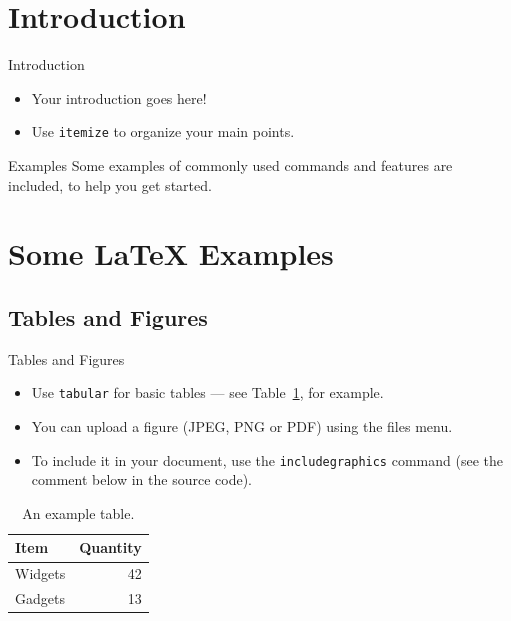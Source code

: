 \documentclass{beamer}
\begin{document}

\section{Introduction}

\begin{frame}{Introduction}

\begin{itemize}
  \item Your introduction goes here!
  \item Use \texttt{itemize} to organize your main points.
\end{itemize}

\begin{block}{Examples}
Some examples of commonly used commands and features are included, to help you get started.
\end{block}

\end{frame}

\section{Some \LaTeX{} Examples}

\subsection{Tables and Figures}

\begin{frame}{Tables and Figures}

\begin{itemize}
\item Use \texttt{tabular} for basic tables --- see Table~\ref{tab:widgets}, for example.
\item You can upload a figure (JPEG, PNG or PDF) using the files menu. 
\item To include it in your document, use the \texttt{includegraphics} command (see the comment below in the source code).
\end{itemize}


\begin{table}
\centering
\begin{tabular}{l|r}
Item & Quantity \\\hline
Widgets & 42 \\
Gadgets & 13
\end{tabular}
\caption{\label{tab:widgets}An example table.}
\end{table}

\end{frame}
\end{document}
